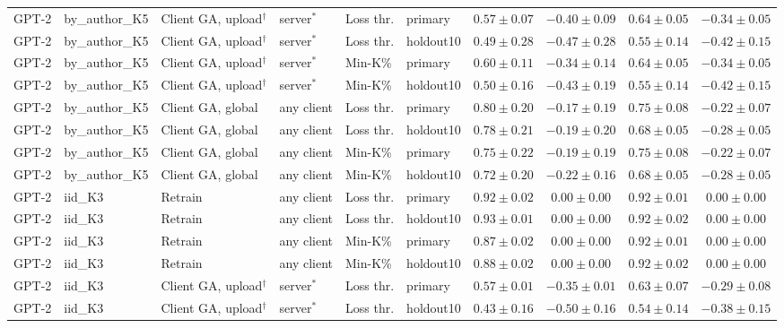 {\begin{longtable}{@{\extracolsep{\fill}}llllllcccc@{}}
GPT-2 & by\_author\_K5 & Client GA, upload$^{\dagger}$ & server$^{*}$ & Loss thr. & primary & $0.57 \pm 0.07$ & $-0.40 \pm 0.09$ & $0.64 \pm 0.05$ & $-0.34 \pm 0.05$ \\
GPT-2 & by\_author\_K5 & Client GA, upload$^{\dagger}$ & server$^{*}$ & Loss thr. & holdout10 & $0.49 \pm 0.28$ & $-0.47 \pm 0.28$ & $0.55 \pm 0.14$ & $-0.42 \pm 0.15$ \\
GPT-2 & by\_author\_K5 & Client GA, upload$^{\dagger}$ & server$^{*}$ & Min-K\% & primary & $0.60 \pm 0.11$ & $-0.34 \pm 0.14$ & $0.64 \pm 0.05$ & $-0.34 \pm 0.05$ \\
GPT-2 & by\_author\_K5 & Client GA, upload$^{\dagger}$ & server$^{*}$ & Min-K\% & holdout10 & $0.50 \pm 0.16$ & $-0.43 \pm 0.19$ & $0.55 \pm 0.14$ & $-0.42 \pm 0.15$ \\
GPT-2 & by\_author\_K5 & Client GA, global & any client & Loss thr. & primary & $0.80 \pm 0.20$ & $-0.17 \pm 0.19$ & $0.75 \pm 0.08$ & $-0.22 \pm 0.07$ \\
GPT-2 & by\_author\_K5 & Client GA, global & any client & Loss thr. & holdout10 & $0.78 \pm 0.21$ & $-0.19 \pm 0.20$ & $0.68 \pm 0.05$ & $-0.28 \pm 0.05$ \\
GPT-2 & by\_author\_K5 & Client GA, global & any client & Min-K\% & primary & $0.75 \pm 0.22$ & $-0.19 \pm 0.19$ & $0.75 \pm 0.08$ & $-0.22 \pm 0.07$ \\
GPT-2 & by\_author\_K5 & Client GA, global & any client & Min-K\% & holdout10 & $0.72 \pm 0.20$ & $-0.22 \pm 0.16$ & $0.68 \pm 0.05$ & $-0.28 \pm 0.05$ \\
GPT-2 & iid\_K3 & Retrain & any client & Loss thr. & primary & $0.92 \pm 0.02$ & $0.00 \pm 0.00$ & $0.92 \pm 0.01$ & $0.00 \pm 0.00$ \\
GPT-2 & iid\_K3 & Retrain & any client & Loss thr. & holdout10 & $0.93 \pm 0.01$ & $0.00 \pm 0.00$ & $0.92 \pm 0.02$ & $0.00 \pm 0.00$ \\
GPT-2 & iid\_K3 & Retrain & any client & Min-K\% & primary & $0.87 \pm 0.02$ & $0.00 \pm 0.00$ & $0.92 \pm 0.01$ & $0.00 \pm 0.00$ \\
GPT-2 & iid\_K3 & Retrain & any client & Min-K\% & holdout10 & $0.88 \pm 0.02$ & $0.00 \pm 0.00$ & $0.92 \pm 0.02$ & $0.00 \pm 0.00$ \\
GPT-2 & iid\_K3 & Client GA, upload$^{\dagger}$ & server$^{*}$ & Loss thr. & primary & $0.57 \pm 0.01$ & $-0.35 \pm 0.01$ & $0.63 \pm 0.07$ & $-0.29 \pm 0.08$ \\
GPT-2 & iid\_K3 & Client GA, upload$^{\dagger}$ & server$^{*}$ & Loss thr. & holdout10 & $0.43 \pm 0.16$ & $-0.50 \pm 0.16$ & $0.54 \pm 0.14$ & $-0.38 \pm 0.15$ \\

\end{longtable}}
